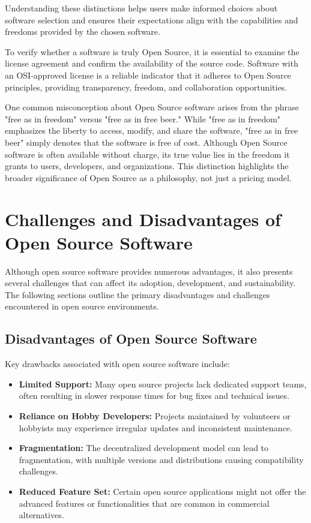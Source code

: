 Understanding these distinctions helps users make informed choices about software selection and ensures their expectations align with the capabilities and freedoms provided by the chosen software.

To verify whether a software is truly Open Source, it is essential to examine the license agreement and confirm the availability of the source code. 
Software with an OSI-approved license is a reliable indicator that it adheres to Open Source principles, providing transparency, freedom, and collaboration opportunities.

One common misconception about Open Source software arises from the phrase "free as in freedom" versus "free as in free beer." While "free as in freedom" emphasizes the liberty to access, modify, and share the software, "free as in free beer" simply denotes that the software is free of cost. 
Although Open Source software is often available without charge, its true value lies in the freedom it grants to users, developers, and organizations. 
This distinction highlights the broader significance of Open Source as a philosophy, not just a pricing model.

\cite{forbes_misconceptions_open_source_2024}

\section{Challenges and Disadvantages of Open Source Software}

Although open source software provides numerous advantages, it also presents several challenges that can affect its adoption, development, and sustainability. The following sections outline the primary disadvantages and challenges encountered in open source environments.

\subsection{Disadvantages of Open Source Software}

Key drawbacks associated with open source software include:

\begin{itemize}
    \item \textbf{Limited Support:} Many open source projects lack dedicated support teams, often resulting in slower response times for bug fixes and technical issues.
    \item \textbf{Reliance on Hobby Developers:} Projects maintained by volunteers or hobbyists may experience irregular updates and inconsistent maintenance.
    \item \textbf{Fragmentation:} The decentralized development model can lead to fragmentation, with multiple versions and distributions causing compatibility challenges.
    \item \textbf{Reduced Feature Set:} Certain open source applications might not offer the advanced features or functionalities that are common in commercial alternatives.
\end{itemize}

